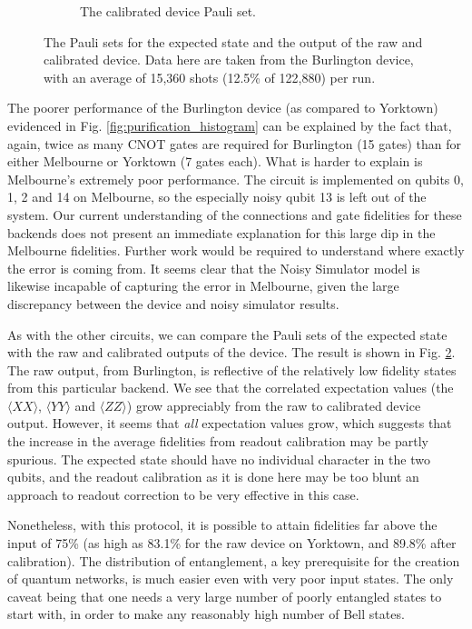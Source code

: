 \begin{figure}[h!]
\begin{subfigure}{.5\textwidth}
		\caption{The calibrated device Pauli set.}
		\label{fig:pur_pauli_cal}
	\end{subfigure}
	\caption{The Pauli sets for the expected state and the output of the raw and
    calibrated device. Data here are taken from the Burlington device, with an
    average of 15,360 shots (12.5\% of 122,880) per run.}
	\label{fig:purification_paulis}
\end{figure}

The poorer performance of the Burlington device (as compared to Yorktown)
evidenced in Fig. \ref{fig:purification_histogram} can be explained by the fact
that, again, twice as many CNOT gates are required for Burlington (15 gates)
than for either Melbourne or Yorktown (7 gates each). What is harder to explain
is Melbourne's extremely poor performance. The circuit is implemented on qubits
0, 1, 2 and 14 on Melbourne, so the especially noisy qubit 13 is left out of the
system. Our current understanding of the connections and gate fidelities for
these backends does not present an immediate explanation for this large dip in
the Melbourne fidelities. Further work would be required to understand where
exactly the error is coming from. It seems clear that the Noisy Simulator model
is likewise incapable of capturing the error in Melbourne, given the large
discrepancy between the device and noisy simulator results.

As with the other circuits, we can compare the Pauli sets of the expected state
with the raw and calibrated outputs of the device. The result is shown in Fig.
\ref{fig:purification_paulis}. The raw output, from Burlington, is reflective of
the relatively low fidelity states from this particular backend. We see that the
correlated expectation values (the $\langle XX \rangle$, $\langle YY \rangle$
and $\langle ZZ \rangle$) grow appreciably from the raw to calibrated device
output. However, it seems that \textit{all} expectation values grow, which
suggests that the increase in the average fidelities from readout calibration
may be partly spurious. The expected state should have no individual character
in the two qubits, and the readout calibration as it is done here may be too
blunt an approach to readout correction to be very effective in this case.

Nonetheless, with this protocol, it is possible to attain fidelities far above
the input of 75\% (as high as 83.1\% for the raw device on Yorktown, and 89.8\%
after calibration). The distribution of entanglement, a key prerequisite for the
creation of quantum networks, is much easier even with very poor input states.
The only caveat being that one needs a very large number of poorly entangled
states to start with, in order to make any reasonably high number of Bell states.

